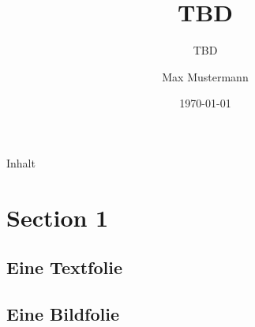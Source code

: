 \documentclass[aspectratio=1610]{../tuprolis}
\title{TBD}
\subtitle{TBD}
\institute{TBD}
\author{Max Mustermann}
\date{\today}
\begin{document}
	
\frame[plain]{\titlepage} 

\begin{frame}[plain]{Inhalt}
	\tableofcontents
\end{frame}


\section{Section 1}

\subsection{Eine Textfolie}


\subsection{Eine Bildfolie}

\end{document}
